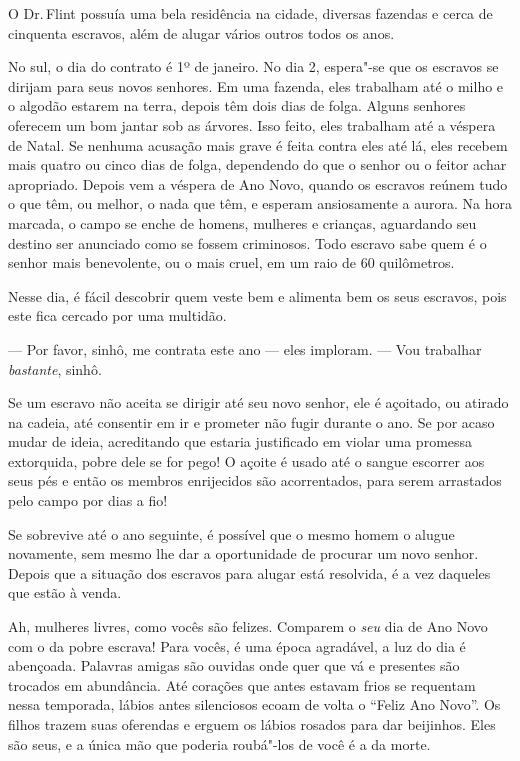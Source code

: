 O Dr.\,Flint possuía uma bela residência
na cidade, diversas fazendas e cerca de cinquenta escravos, além de
alugar vários outros todos os anos.

No sul, o dia do contrato é 1º de
janeiro. No dia 2, espera"-se que os escravos se dirijam para seus novos
senhores. Em uma fazenda, eles trabalham até o milho e o algodão estarem
na terra, depois têm dois dias de folga. Alguns senhores oferecem um bom
jantar sob as árvores. Isso feito, eles trabalham até a véspera de
Natal. Se nenhuma acusação mais grave é feita contra eles até lá, eles
recebem mais quatro ou cinco dias de folga, dependendo do que o senhor
ou o feitor achar apropriado. Depois vem a véspera de Ano Novo, quando
os escravos reúnem tudo o que têm, ou melhor, o nada que têm, e esperam
ansiosamente a aurora. Na hora marcada, o campo se enche de homens,
mulheres e crianças, aguardando seu destino ser anunciado como se fossem
criminosos. Todo escravo sabe quem é o senhor mais benevolente, ou o
mais cruel, em um raio de 60 quilômetros.

Nesse dia, é fácil descobrir quem veste
bem e alimenta bem os seus escravos, pois este fica cercado por uma
multidão.

--- Por favor, sinhô, me contrata este ano --- eles imploram. --- Vou
trabalhar \emph{bastante}, sinhô.

Se um escravo não aceita se dirigir até
seu novo senhor, ele é açoitado, ou atirado na cadeia, até consentir em
ir e prometer não fugir durante o ano. Se por acaso mudar de ideia,
acreditando que estaria justificado em violar uma promessa extorquida,
pobre dele se for pego! O açoite é usado até o sangue escorrer aos seus
pés e então os membros enrijecidos são acorrentados, para serem
arrastados pelo campo por dias a fio!

Se sobrevive até o ano seguinte, é
possível que o mesmo homem o alugue novamente, sem mesmo lhe dar a
oportunidade de procurar um novo senhor. Depois que a situação dos
escravos para alugar está resolvida, é a vez daqueles que estão à venda.

Ah, mulheres livres, como vocês são
felizes. Comparem o \emph{seu} dia de Ano Novo com o da pobre escrava!
Para vocês, é uma época agradável, a luz do dia é abençoada. Palavras
amigas são ouvidas onde quer que vá e presentes são trocados em
abundância. Até corações que antes estavam frios se requentam nessa
temporada, lábios antes silenciosos ecoam de volta o ``Feliz Ano Novo''.
Os filhos trazem suas oferendas e erguem os lábios rosados para dar
beijinhos. Eles são seus, e a única mão que poderia roubá"-los de você é
a da morte.

